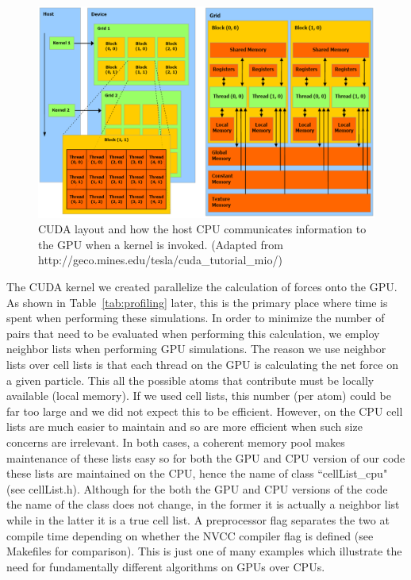 \documentclass[12pt]{article}
\begin{document}
\begin{figure}[H]
   	\includegraphics[width=\textwidth]{gpu2.png}
	\caption{CUDA layout and how the host CPU communicates information to the GPU when a kernel is invoked. (Adapted from http://geco.mines.edu/tesla/cuda\_tutorial\_mio/)}
	\label{fig:cuda}
\end{figure}

The CUDA kernel we created parallelize the calculation of forces onto the GPU.  As shown in Table~\ref{tab:profiling} later, this is the primary place where time is spent when performing these simulations.  In order to minimize the number of pairs that need to be evaluated when performing this calculation, we employ neighbor lists when performing GPU simulations.  The reason we use neighbor lists over cell lists is that each thread on the GPU is calculating the net force on a given particle.  This all the possible atoms that contribute must be locally available (local memory).  If we used cell lists, this number (per atom) could be far too large and we did not expect this to be efficient.  However, on the CPU cell lists are much easier to maintain and so are more efficient when such size concerns are irrelevant.  In both cases, a coherent memory pool makes maintenance of these lists easy so for both the GPU and CPU version of our code these lists are maintained on the CPU, hence the name of class ``cellList\_cpu" (see cellList.h).  Although for the both the GPU and CPU versions of the code the name of the class does not change, in the former it is actually a neighbor list while in the latter it is a true cell list.  A preprocessor flag separates the two at compile time depending on whether the NVCC compiler flag is defined (see Makefiles for comparison).  This is just one of many examples which illustrate the need for fundamentally different algorithms on GPUs over CPUs.
\end{document}
